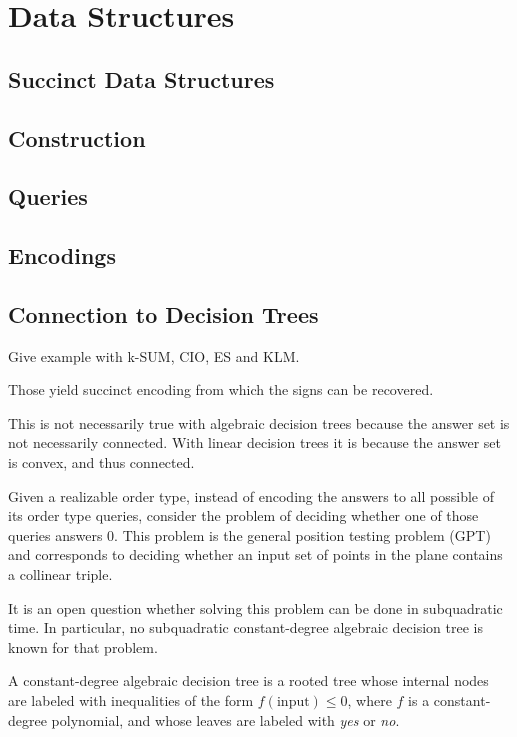 \section{Data Structures}

\subsection{Succinct Data Structures}

\subsection{Construction}

\subsection{Queries}

\subsection{Encodings}

\subsection{Connection to Decision Trees}

Give example with k-SUM, CIO, ES and KLM.

Those yield succinct encoding from which the signs can be recovered.

This is not necessarily true with algebraic decision trees because the answer
set is not necessarily connected. With linear decision trees it is because the
answer set is convex, and thus connected.

Given a realizable order type, instead of encoding the answers to all possible
of its order type queries, consider the problem of deciding whether one of
those queries answers \(0\).
This problem is the general position testing problem (GPT) and corresponds to
deciding whether an input set of points in the plane contains a collinear
triple.

It is an open question whether solving this problem can be done in subquadratic
time. In particular, no subquadratic constant-degree algebraic decision tree is
known for that problem.

A constant-degree algebraic decision tree is a rooted tree whose internal nodes are
labeled with inequalities of the form \(f(\text{input}) \leq 0\), where
\(f\) is a constant-degree polynomial,
and whose leaves are labeled with \emph{yes} or \emph{no}.


